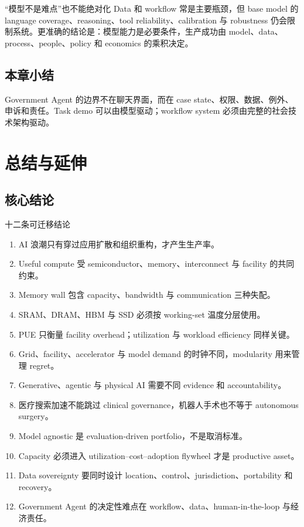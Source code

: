 \documentclass[a4paper]{article}
\begin{document}
\begin{warningbox}{“模型不是难点”也不能绝对化}
Data 和 workflow 常是主要瓶颈，但 base model 的 language coverage、reasoning、tool reliability、calibration 与 robustness 仍会限制系统。更准确的结论是：模型能力是必要条件，生产成功由 model、data、process、people、policy 和 economics 的乘积决定。
\end{warningbox}


\subsection{本章小结}

Government Agent 的边界不在聊天界面，而在 case state、权限、数据、例外、申诉和责任。Task demo 可以由模型驱动；workflow system 必须由完整的社会技术架构驱动。

\section{总结与延伸}

\subsection{核心结论}

\begin{importantbox}{十二条可迁移结论}
\begin{enumerate}
  \item AI 浪潮只有穿过应用扩散和组织重构，才产生生产率。
  \item Useful compute 受 semiconductor、memory、interconnect 与 facility 的共同约束。
  \item Memory wall 包含 capacity、bandwidth 与 communication 三种失配。
  \item SRAM、DRAM、HBM 与 SSD 必须按 working-set 温度分层使用。
  \item PUE 只衡量 facility overhead；utilization 与 workload efficiency 同样关键。
  \item Grid、facility、accelerator 与 model demand 的时钟不同，modularity 用来管理 regret。
  \item Generative、agentic 与 physical AI 需要不同 evidence 和 accountability。
  \item 医疗搜索加速不能跳过 clinical governance，机器人手术也不等于 autonomous surgery。
  \item Model agnostic 是 evaluation-driven portfolio，不是取消标准。
  \item Capacity 必须进入 utilization--cost--adoption flywheel 才是 productive asset。
  \item Data sovereignty 要同时设计 location、control、jurisdiction、portability 和 recovery。
  \item Government Agent 的决定性难点在 workflow、data、human-in-the-loop 与经济责任。
\end{enumerate}
\end{importantbox}
\end{document}
